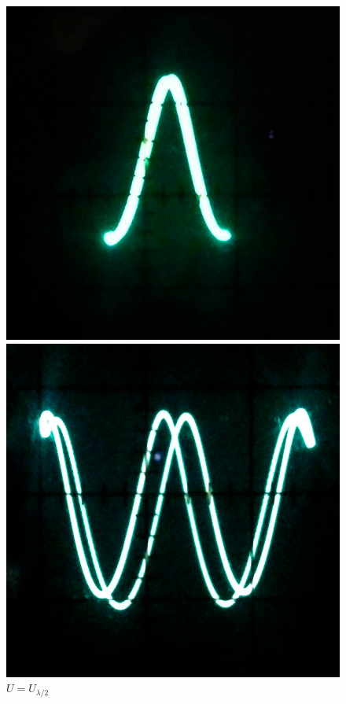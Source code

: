 \documentclass[a4paper,12pt]{article}
\begin{document}
		\begin{figure}[h!]
			\begin{center}
				\begin{minipage}{0.3\textwidth}
					\includegraphics[width=\textwidth]{one}
					\caption{$U = U_{\lambda/2}$}
				\end{minipage}
				\hfill
				\begin{minipage}{0.3\textwidth}
					\includegraphics[width=\textwidth]{two}

\end{minipage}
\end{center}
\end{figure}
\end{document}
